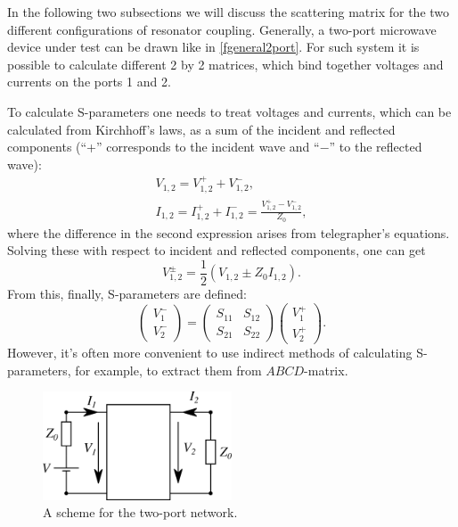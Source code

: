 \documentclass[12pt]{report}
\newcommand{\rbrkt}[1]{\left( #1 \right)}
\numberwithin{equation}{section}
\begin{document}
In the following two subsections we will discuss the scattering matrix for the two different configurations of resonator coupling. Generally, a two-port microwave device under test can be drawn like in \autoref{fgeneral2port}. For such system it is possible to calculate different 2 by 2 matrices, which bind together voltages and currents on the ports 1 and 2.

To calculate S-parameters one needs to treat voltages and currents, which can be calculated from Kirchhoff's laws, as a sum of the incident and reflected components (``+'' corresponds to the incident wave and ``$-$'' to the reflected wave):
\begin{gather*}
V_{1,2} = V_{1,2}^+ + V_{1,2}^- ,\\
I_{1,2} = I_{1,2}^+ + I_{1,2}^- = \frac{ V_{1,2}^+ - V_{1,2}^- }{Z_0},
\end{gather*}
where the difference in the second expression arises from telegrapher's equations. Solving these with respect to incident and reflected components, one can get
\begin{equation*}
V_{1,2}^\pm = \frac{1}{2}(V_{1,2} \pm Z_0 I_{1,2}).
\end{equation*}
From this, finally, S-parameters are defined:
\begin{equation}
\rbrkt{\begin{matrix}
V_1^- \\
V_2^-
\end{matrix}} = 
\rbrkt{\begin{matrix}
S_{11} & S_{12} \\
S_{21} & S_{22}
\end{matrix}}
\rbrkt{\begin{matrix}
V_1^+ \\
V_2^+
\end{matrix}}.
\label{eq:S_def}
\end{equation}
However, it's often more convenient to use indirect methods of calculating S-parameters, for example, to extract them from $ABCD$-matrix.

\begin{figure}
\centering
\includegraphics[width=0.5\textwidth]{tl_scheme_general}
\caption{A scheme for the two-port network.}
\label{fgeneral2port}
\end{figure}
\end{document}
